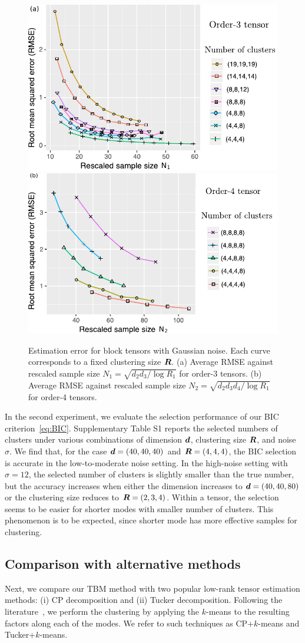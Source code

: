 \documentclass[11pt]{article}
\theoremstyle{plain}
\theoremstyle{definition}
\begin{document}
\begin{figure}[h!]

\centering
\includegraphics[width=.4\textwidth]{figure.pdf}
\includegraphics[width=.4\textwidth]{rescale_order4.pdf}
\caption{\small Estimation error for block tensors with Gaussian noise. Each curve corresponds to a fixed clustering size $\bm{R}$. (a) Average RMSE against rescaled sample size $N_1=\sqrt{d_2d_3/\log R_1}$ for order-3 tensors. (b) Average RMSE against rescaled sample size $N_2=\sqrt{d_2d_3d_4/\log R_1}$ for order-4 tensors. 
}\label{fig:RMSE}

\end{figure}

In the second experiment, we evaluate the selection performance of our BIC criterion~\eqref{eq:BIC}. Supplementary Table S1 reports the selected numbers of clusters under various combinations of dimension $\bm{d}$, clustering size $\bm{R}$, and noise $\sigma$. We find that, for the case $\bm{d}=(40,40,40)$ and $\bm{R}=(4,4,4)$, the BIC selection is accurate in the low-to-moderate noise setting. In the high-noise setting with $\sigma=12$, the selected number of clusters is slightly smaller than the true number, but the accuracy increases when either the dimension increases to $\bm{d}=(40,40,80)$ or the clustering size reduces to $\bm{R}=(2,3,4)$. Within a tensor, the selection seems to be easier for shorter modes with smaller number of clusters. This phenomenon is to be expected, since shorter mode has more effective samples for clustering. 


\subsection{Comparison with alternative methods}

Next, we compare our TBM method with two popular low-rank tensor estimation methods: (i) CP decomposition and (ii) Tucker decomposition. Following the literature~\cite{chi2018provable,hore2016tensor,kolda2008scalable}, we perform the clustering by applying the $k$-means to the resulting factors along each of the modes. We refer to such techniques as CP+$k$-means and Tucker+$k$-means. 
\end{document}
